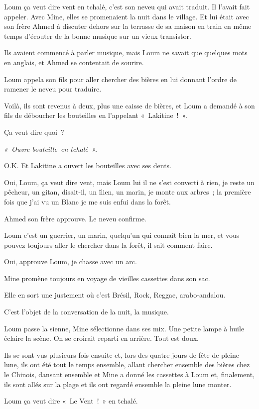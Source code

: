 \documentclass[french,twoside]{book} %
\begin{document}
\noindent Loum ça veut dire vent en tchalé, c’est son neveu qui avait traduit. Il l’avait fait appeler. Avec Mine, elles se promenaient la nuit dans le village. Et lui était avec son frère Ahmed à discuter dehors sur la terrasse de sa maison en train en même temps d’écouter de la bonne musique sur un vieux transistor.\par
Ils avaient commencé à parler musique, mais Loum ne savait que quelques mots en anglais, et Ahmed se contentait de sourire.\par
Loum appela son fils pour aller chercher des bières en lui donnant l’ordre de ramener le neveu pour traduire.\par
Voilà, ils sont revenus à deux, plus une caisse de bières, et Loum a demandé à son fils de déboucher les bouteilles en l’appelant « Lakitine ! ».\par
Ça veut dire quoi ?\par
\emph{« Ouvre-bouteille en tchalé ».}\par
O.K. Et Lakitine a ouvert les bouteilles avec ses dents.\par
Oui, Loum, ça veut dire vent, mais Loum lui il ne s’est converti à rien, je reste un pêcheur, un gitan, disait-il, un îlien, un marin, je monte aux arbres ; la première fois que j’ai vu un Blanc je me suis enfui dans la forêt.\par
Ahmed son frère approuve. Le neveu confirme.\par
Loum c’est un guerrier, un marin, quelqu’un qui connaît bien la mer, et vous pouvez toujours aller le chercher dans la forêt, il sait comment faire.\par
Oui, approuve Loum, je chasse avec un arc.\par
Mine promène toujours en voyage de vieilles cassettes dans son sac.\par
Elle en sort une justement où c’est Brésil, Rock, Reggae, arabo-andalou.\par
C’est l’objet de la conversation de la nuit, la musique.\par
Loum passe la sienne, Mine sélectionne dans ses mix. Une petite lampe à huile éclaire la scène. On se croirait reparti en arrière. Tout est doux.\par
Ils se sont vus plusieurs fois ensuite et, lors des quatre jours de fête de pleine lune, ils ont été tout le temps ensemble, allant chercher ensemble des bières chez le Chinois, dansant ensemble et Mine a donné les cassettes à Loum et, finalement, ils sont allés sur la plage et ils ont regardé ensemble la pleine lune monter.\par
Loum ça veut dire « Le Vent ! » en tchalé.
\end{document}
